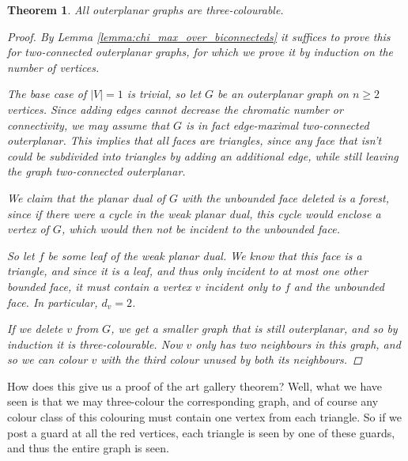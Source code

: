 \documentclass[nobib]{tufte-handout}
\newtheorem{theorem}{Theorem}
\begin{document}
\begin{theorem}
  All outerplanar graphs are three-colourable.

  \begin{proof}
    By Lemma \ref{lemma:chi_max_over_biconnecteds} it suffices to prove this for two-connected outerplanar graphs, for which we prove it by induction on the number of vertices. 
    
    The base case of $|{V}| = 1$ is trivial, so let $G$ be an outerplanar graph on $n \geq 2$ vertices. Since adding edges cannot decrease the chromatic number or connectivity, we may assume that $G$ is in fact edge-maximal two-connected outerplanar. This implies that all faces are triangles, since any face that isn't could be subdivided into triangles by adding an additional edge, while still leaving the graph two-connected outerplanar.

    We claim that the planar dual of $G$ with the unbounded face deleted is a forest, since if there were a cycle in the weak planar dual, this cycle would enclose a vertex of $G$, which would then not be incident to the unbounded face.

    So let $f$ be some leaf of the weak planar dual. We know that this face is a triangle, and since it is a leaf, and thus only incident to at most one other bounded face, it must contain a vertex $v$ incident only to $f$ and the unbounded face. In particular, $d_v = 2$.

    If we delete $v$ from $G$, we get a smaller graph that is still outerplanar, and so by induction it is three-colourable. Now $v$ only has two neighbours in this graph, and so we can colour $v$ with the third colour unused by both its neighbours.
  \end{proof}
\end{theorem}

How does this give us a proof of the art gallery theorem? Well, what we have seen is that we may three-colour the corresponding graph, and of course any colour class of this colouring must contain one vertex from each triangle. So if we post a guard at all the red vertices, each triangle is seen by one of these guards, and thus the entire graph is seen.
\end{document}

